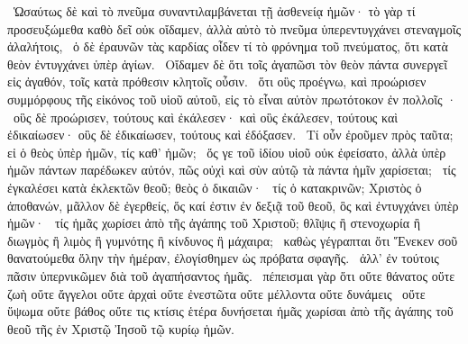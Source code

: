 ~Ὡσαύτως δὲ καὶ τὸ πνεῦμα συναντιλαμβάνεται τῇ ἀσθενείᾳ ἡμῶν· τὸ γὰρ τί προσευξώμεθα καθὸ δεῖ οὐκ οἴδαμεν, ἀλλὰ αὐτὸ τὸ πνεῦμα ὑπερεντυγχάνει στεναγμοῖς ἀλαλήτοις,
~ὁ δὲ ἐραυνῶν τὰς καρδίας οἶδεν τί τὸ φρόνημα τοῦ πνεύματος, ὅτι κατὰ θεὸν ἐντυγχάνει ὑπὲρ ἁγίων.
~Οἴδαμεν δὲ ὅτι τοῖς ἀγαπῶσι τὸν θεὸν πάντα συνεργεῖ εἰς ἀγαθόν, τοῖς κατὰ πρόθεσιν κλητοῖς οὖσιν.
~ὅτι οὓς προέγνω, καὶ προώρισεν συμμόρφους τῆς εἰκόνος τοῦ υἱοῦ αὐτοῦ, εἰς τὸ εἶναι αὐτὸν πρωτότοκον ἐν πολλοῖς ·
~οὓς δὲ προώρισεν, τούτους καὶ ἐκάλεσεν· καὶ οὓς ἐκάλεσεν, τούτους καὶ ἐδικαίωσεν· οὓς δὲ ἐδικαίωσεν, τούτους καὶ ἐδόξασεν.
~Τί οὖν ἐροῦμεν πρὸς ταῦτα; εἰ ὁ θεὸς ὑπὲρ ἡμῶν, τίς καθ’ ἡμῶν;
~ὅς γε τοῦ ἰδίου υἱοῦ οὐκ ἐφείσατο, ἀλλὰ ὑπὲρ ἡμῶν πάντων παρέδωκεν αὐτόν, πῶς οὐχὶ καὶ σὺν αὐτῷ τὰ πάντα ἡμῖν χαρίσεται;
~τίς ἐγκαλέσει κατὰ ἐκλεκτῶν θεοῦ; θεὸς ὁ δικαιῶν·
~τίς ὁ κατακρινῶν; Χριστὸς ὁ ἀποθανών, μᾶλλον δὲ ἐγερθείς, ὅς καί ἐστιν ἐν δεξιᾷ τοῦ θεοῦ, ὃς καὶ ἐντυγχάνει ὑπὲρ ἡμῶν·
~τίς ἡμᾶς χωρίσει ἀπὸ τῆς ἀγάπης τοῦ Χριστοῦ; θλῖψις ἢ στενοχωρία ἢ διωγμὸς ἢ λιμὸς ἢ γυμνότης ἢ κίνδυνος ἢ μάχαιρα;
~καθὼς γέγραπται ὅτι Ἕνεκεν σοῦ θανατούμεθα ὅλην τὴν ἡμέραν, ἐλογίσθημεν ὡς πρόβατα σφαγῆς.
~ἀλλ’ ἐν τούτοις πᾶσιν ὑπερνικῶμεν διὰ τοῦ ἀγαπήσαντος ἡμᾶς.
~πέπεισμαι γὰρ ὅτι οὔτε θάνατος οὔτε ζωὴ οὔτε ἄγγελοι οὔτε ἀρχαὶ οὔτε ἐνεστῶτα οὔτε μέλλοντα οὔτε δυνάμεις
~οὔτε ὕψωμα οὔτε βάθος οὔτε τις κτίσις ἑτέρα δυνήσεται ἡμᾶς χωρίσαι ἀπὸ τῆς ἀγάπης τοῦ θεοῦ τῆς ἐν Χριστῷ Ἰησοῦ τῷ κυρίῳ ἡμῶν.

